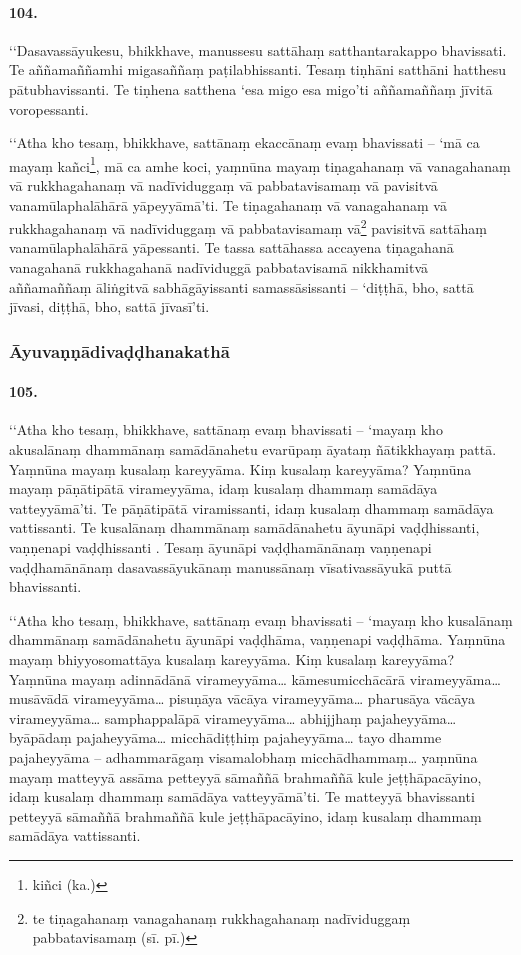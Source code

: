 \paragraph{104.} ‘‘Dasavassāyukesu, bhikkhave, manussesu sattāhaṃ satthantarakappo bhavissati. Te aññamaññamhi migasaññaṃ paṭilabhissanti. Tesaṃ tiṇhāni satthāni hatthesu pātubhavissanti. Te tiṇhena satthena ‘esa migo esa migo’ti aññamaññaṃ jīvitā voropessanti.

‘‘Atha kho tesaṃ, bhikkhave, sattānaṃ ekaccānaṃ evaṃ bhavissati – ‘mā ca mayaṃ kañci\footnote{kiñci (ka.)}, mā ca amhe koci, yaṃnūna mayaṃ tiṇagahanaṃ vā vanagahanaṃ vā rukkhagahanaṃ vā nadīviduggaṃ vā pabbatavisamaṃ vā pavisitvā vanamūlaphalāhārā yāpeyyāmā’ti. Te tiṇagahanaṃ vā vanagahanaṃ vā rukkhagahanaṃ vā nadīviduggaṃ vā pabbatavisamaṃ vā\footnote{te tiṇagahanaṃ vanagahanaṃ rukkhagahanaṃ nadīviduggaṃ pabbatavisamaṃ (sī. pī.)} pavisitvā sattāhaṃ vanamūlaphalāhārā yāpessanti. Te tassa sattāhassa accayena tiṇagahanā vanagahanā rukkhagahanā nadīviduggā pabbatavisamā nikkhamitvā aññamaññaṃ āliṅgitvā sabhāgāyissanti samassāsissanti – ‘diṭṭhā, bho, sattā jīvasi, diṭṭhā, bho, sattā jīvasī’ti.

\subsubsection{Āyuvaṇṇādivaḍḍhanakathā}

\paragraph{105.} ‘‘Atha kho tesaṃ, bhikkhave, sattānaṃ evaṃ bhavissati – ‘mayaṃ kho akusalānaṃ dhammānaṃ samādānahetu evarūpaṃ āyataṃ ñātikkhayaṃ pattā. Yaṃnūna mayaṃ kusalaṃ kareyyāma. Kiṃ kusalaṃ kareyyāma? Yaṃnūna mayaṃ pāṇātipātā virameyyāma, idaṃ kusalaṃ dhammaṃ samādāya vatteyyāmā’ti. Te pāṇātipātā viramissanti, idaṃ kusalaṃ dhammaṃ samādāya vattissanti. Te kusalānaṃ dhammānaṃ samādānahetu āyunāpi vaḍḍhissanti, vaṇṇenapi vaḍḍhissanti . Tesaṃ āyunāpi vaḍḍhamānānaṃ vaṇṇenapi vaḍḍhamānānaṃ dasavassāyukānaṃ manussānaṃ vīsativassāyukā puttā bhavissanti.

‘‘Atha kho tesaṃ, bhikkhave, sattānaṃ evaṃ bhavissati – ‘mayaṃ kho kusalānaṃ dhammānaṃ samādānahetu āyunāpi vaḍḍhāma, vaṇṇenapi vaḍḍhāma. Yaṃnūna mayaṃ bhiyyosomattāya kusalaṃ kareyyāma. Kiṃ kusalaṃ kareyyāma? Yaṃnūna mayaṃ adinnādānā virameyyāma… kāmesumicchācārā virameyyāma… musāvādā virameyyāma… pisuṇāya vācāya virameyyāma… pharusāya vācāya virameyyāma… samphappalāpā virameyyāma… abhijjhaṃ pajaheyyāma… byāpādaṃ pajaheyyāma… micchādiṭṭhiṃ pajaheyyāma… tayo dhamme pajaheyyāma – adhammarāgaṃ visamalobhaṃ micchādhammaṃ… yaṃnūna mayaṃ matteyyā assāma petteyyā sāmaññā brahmaññā kule jeṭṭhāpacāyino, idaṃ kusalaṃ dhammaṃ samādāya vatteyyāmā’ti. Te matteyyā bhavissanti petteyyā sāmaññā brahmaññā kule jeṭṭhāpacāyino, idaṃ kusalaṃ dhammaṃ samādāya vattissanti.

